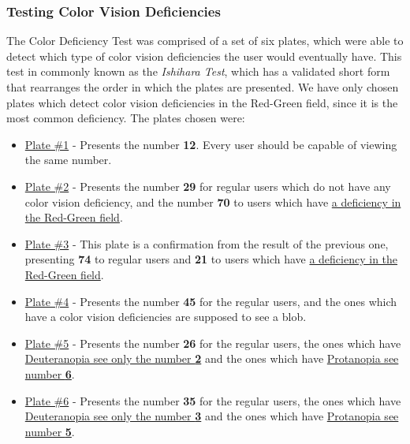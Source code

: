 \subsubsection{Testing Color Vision Deficiencies}
%
The Color Deficiency Test was comprised of a set of six plates, which were able to detect which type of color
vision deficiencies the user would eventually have. This test in commonly known as the \emph{Ishihara Test},
which has a validated \cite{Alwis1992} short form that rearranges the order in which the plates are presented.
We have only chosen plates which detect color vision deficiencies in the Red-Green field, since it is the most
common deficiency. The plates chosen were:
%
\begin{itemize}
	\item \ul{Plate \#1} - Presents the number \textbf{12}. Every user should be capable of viewing the same number.
	\item \ul{Plate \#2} - Presents the number \textbf{29} for regular users which do not have any color vision
  deficiency, and the number \textbf{70} to users which have \ul{a deficiency in the Red-Green field}.
	\item \ul{Plate \#3} - This plate is a confirmation from the result of the previous one, presenting \textbf{74}
  to regular users and \textbf{21} to users which have \ul{a deficiency in the Red-Green field}.
	\item \ul{Plate \#4} - Presents the number \textbf{45} for the regular users, and the ones which have a
  color vision deficiencies are supposed to see a blob.
	\item \ul{Plate \#5} - Presents the number \textbf{26} for the regular users, the ones which have
  \ul{Deuteranopia see only the number \textbf{2}} and the ones which have \ul{Protanopia see number \textbf{6}}.
	\item \ul{Plate \#6} - Presents the number \textbf{35} for the regular users, the ones which have
  \ul{Deuteranopia see only the number \textbf{3}} and the ones which have \ul{Protanopia see number \textbf{5}}.
\end{itemize}
%
